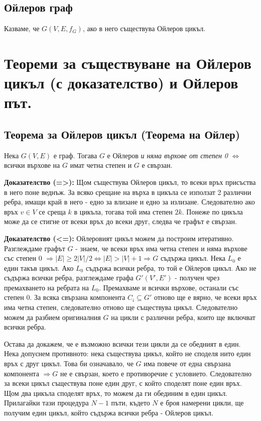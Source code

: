 \documentclass[fleqn,12pt]{article}
\begin{document}
\begin{flushleft}
\subsection{Ойлеров граф} 
Казваме, че $G(V,E,f_G)$, ако в него съществува Ойлеров цикъл.

\section{Теореми за съществуване на Ойлеров цикъл (с доказателство) и Ойлеров път.}

\subsection{Теорема за Ойлеров цикъл (Теорема на Ойлер)} 
Нека $G(V,E)$ е граф. Тогава $G$ е Ойлеров \textit{и няма върхове от степен 0} $\Leftrightarrow$
всички върхове на $G$ имат четна степен и $G$ е свързан.

\textbf{Доказателство (=>): } Щом съществува Ойлеров цикъл, то всеки връх присъства в него поне веднъж.
За всяко срещане на върха в цикъла се използат 2 различни ребра, имащи край в него - едно за влизане и едно за излизане.
Следователно ако връх $v \in V$ се среща $k$ в цикъла, тогава той има степен $2k$. Понеже по цикъла може да се стигне от
всеки връх до всеки друг, следва че графът е свързан.
\vspace{10mm}

\textbf{Доказателство (<=): } Ойлеровият цикъл можем да построим итеративно. Разглеждаме графът $G$ - знаем, че всеки връх има четна степен и
няма върхове със степен 0 $\Rightarrow |E| \geq 2 |V| / 2 \Leftrightarrow |E| > |V| + 1 \Rightarrow G$ съдържа цикъл.  
Нека $L_0$ е един такъв цикъл. Ако $L_0$ съдържа всички ребра, то той е Ойлеров цикъл. 
Ако не съдържа всички ребра, разглеждаме графа $G'(V', E')$ - получен чрез премахването на ребрата на $L_0$. 
Премахваме и всички върхове, останали със степен 0. За всяка свързана компонента $C_i \subseteq G'$ отново ще е вярно,
че всеки връх има четна степен, следователно отново ще съществува цикъл. Следователно можем да разбием оригиналния
$G$ на цикли с различни ребра, които ще включват всички ребра. 

Остава да докажем, че е възможно всички тези цикли да се обедният в един. Нека допуснем противното: нека съществува цикъл,
който не споделя нито един връх с друг цикъл. Това би означавало, че $G$ има повече от една свързана компонента 
$\Rightarrow G$ не е свързан, което е противоречие с условието. Следователно за всеки цикъл съществува поне един друг,
с който споделят поне един връх. Щом два цикъла споделят връх, то можем да ги обединим в един цикъл. Прилагайки тази процедура
$N - 1$ пъти, където $N$ е броя намерени цикли, ще получим един цикъл, който съдържа всички ребра - Ойлеров цикъл. 
\vspace{10mm}


\end{flushleft}
\end{document}
